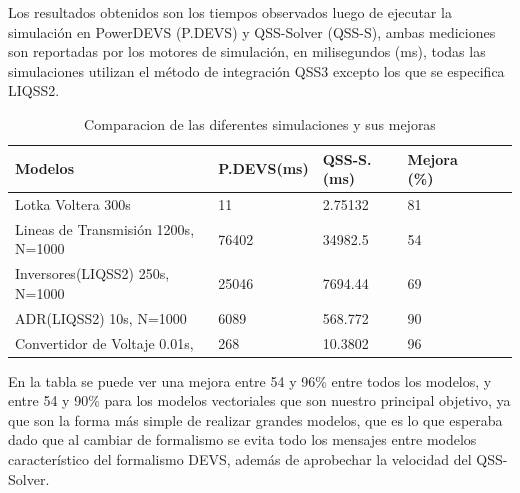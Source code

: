 	Los resultados obtenidos son los tiempos observados luego de ejecutar la simulación en PowerDEVS (P.DEVS) y QSS-Solver (QSS-S), ambas mediciones
	son reportadas por los motores de simulación, en milisegundos (ms), todas las simulaciones utilizan el método de integración QSS3 excepto los que 
	se especifica LIQSS2.

\begin{table}[H]
\centering	
\begin{tabular}{llllll}
\toprule
{\bf Modelos}            &  {\bf P.DEVS(ms)} & {\bf QSS-S. (ms)} & {\bf Mejora (\%)} \\
\toprule
Lotka  Voltera 300s      		& 11            & 2.75132         & 81 \\
Lineas de Transmisión 1200s, N=1000     & 76402         & 34982.5         & 54          \\
Inversores(LIQSS2) 250s, N=1000   	& 25046         & 7694.44         & 69        \\
ADR(LIQSS2) 10s, N=1000 		& 6089          & 568.772         & 90        \\
Convertidor de Voltaje 0.01s,        	& 268           & 10.3802         & 96         

\end{tabular}
\label{result}
\caption{Comparacion de las diferentes simulaciones y sus mejoras}
\end{table}

	En la tabla se puede ver una mejora entre 54 y 96\% entre todos los modelos, y entre 54 y 90\% para los modelos vectoriales que son nuestro principal objetivo,
	ya que son la forma más simple de realizar grandes modelos, que es lo que esperaba dado que al cambiar de formalismo se evita todo los mensajes entre modelos 
	característico del formalismo DEVS, además de aprobechar la velocidad del QSS-Solver.
